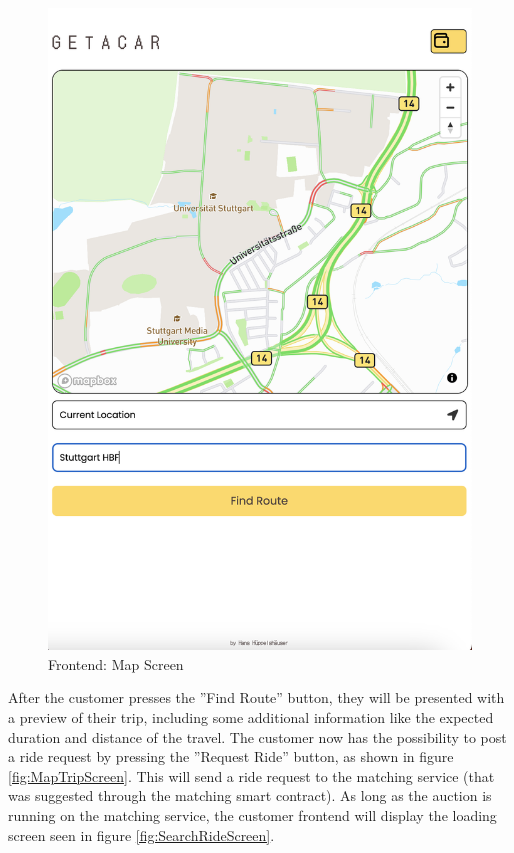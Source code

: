 \begin{figure}[H]
\begin{minipage}{0.45\linewidth}
        \includegraphics[width=\linewidth]{data/ffss/2.png}
        \caption{Frontend: Map Screen}
        \label{fig:MapScreen}
    \end{minipage}
    
\end{figure}

After the customer presses the ''Find Route'' button, they will be presented with a preview of their trip, including some additional information like the expected duration and distance of the travel. The customer now has the possibility to post a ride request by pressing the ''Request Ride'' button, as shown in figure \ref{fig:MapTripScreen}.
This will send a ride request to the matching service (that was suggested through the matching smart contract). As long as the auction is running on the matching service, the customer frontend will display the loading screen seen in figure \ref{fig:SearchRideScreen}.


